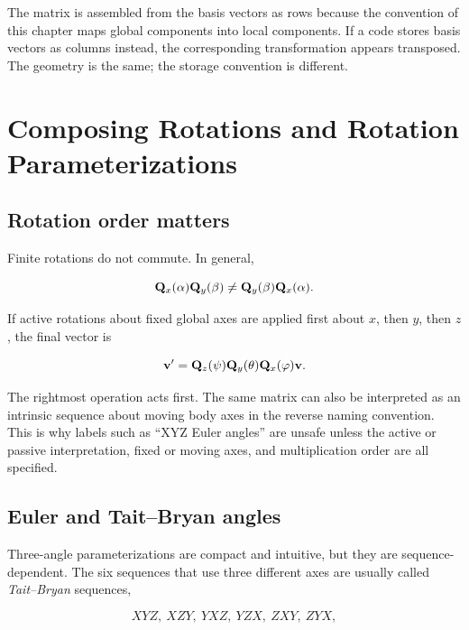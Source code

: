 The matrix is assembled from the basis vectors as rows because the convention of
this chapter maps global components into local components. If a code stores basis
vectors as columns instead, the corresponding transformation appears transposed.
The geometry is the same; the storage convention is different.

\section[Rotation Composition and Parameterizations]{Composing Rotations and Rotation Parameterizations}

\subsection{Rotation order matters}

Finite rotations do not commute. In general,

\begin{equation}
    \mathbf{Q}_x(\alpha)\mathbf{Q}_y(\beta)
    \neq
    \mathbf{Q}_y(\beta)\mathbf{Q}_x(\alpha).
\end{equation}

If active rotations about fixed global axes are applied first about $x$, then
$y$, then $z$, the final vector is

\begin{equation}\label{eq:coord-xyz-composition}
    \mathbf{v}'
    =\mathbf{Q}_z(\psi)\mathbf{Q}_y(\theta)\mathbf{Q}_x(\varphi)\mathbf{v}.
\end{equation}

The rightmost operation acts first. The same matrix can also be interpreted as
an intrinsic sequence about moving body axes in the reverse naming convention.
This is why labels such as ``XYZ Euler angles'' are unsafe unless the active or
passive interpretation, fixed or moving axes, and multiplication order are all
specified.

\subsection{Euler and Tait--Bryan angles}

Three-angle parameterizations are compact and intuitive, but they are
sequence-dependent. The six sequences that use three different axes are usually
called \textit{Tait--Bryan} sequences,

\begin{equation}
    XYZ,\ XZY,\ YXZ,\ YZX,\ ZXY,\ ZYX,
\end{equation}

